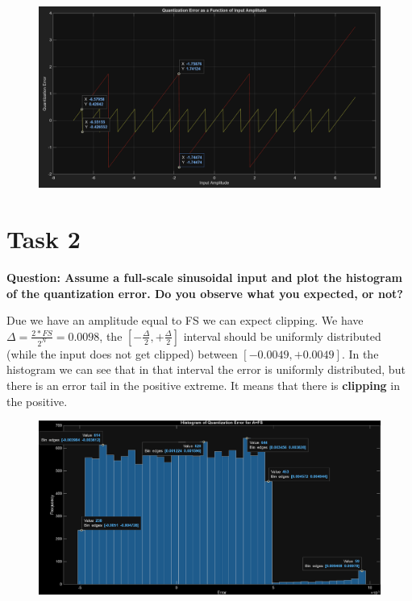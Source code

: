 \documentclass[11pt,a4paper]{article}
\begin{document}
\begin{figure}[H]
    \centering
    \includegraphics[width=1\textwidth]{img/task1_2_2.png}
    \label{fig:task1_2_2}
\end{figure}

\section{Task 2}
\textbf{Question: Assume a full-scale sinusoidal input and plot the histogram of the quantization error. Do you observe what you expected, or not?}

\vspace{0.5cm}
Due we have an amplitude equal to FS we can expect clipping. We have $\Delta= \frac{2*FS}{2^N} = 0.0098$, the $[-\frac{\Delta}{2}, +\frac{\Delta}{2}]$ interval should be uniformly distributed (while the input does not get clipped) between $[-0.0049, +0.0049]$.
In the histogram we can see that in that interval the error is uniformly distributed, but there is an error tail in the positive extreme.
It means that there is \textbf{clipping} in the positive.

\begin{figure}[H]
    \centering
    \includegraphics[width=1\textwidth]{img/task2_1.png}
    \label{fig:task2_1}
\end{figure}
\end{document}
